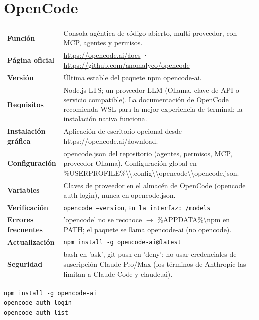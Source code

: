\section{OpenCode}
{\small\begin{tabularx}{\linewidth}{@{}>{\bfseries}p{2.9cm}X@{}}\toprule
Función & Consola agéntica de código abierto, multi-proveedor, con MCP, agentes y permisos.\\
Página oficial & \url{https://opencode.ai/docs} · \url{https://github.com/anomalyco/opencode}\\
Versión & Última estable del paquete npm opencode-ai.\\
Requisitos & Node.js LTS; un proveedor LLM (Ollama, clave de API o servicio compatible). La documentación de OpenCode recomienda WSL para la mejor experiencia de terminal; la instalación nativa funciona.\\
Instalación gráfica & Aplicación de escritorio opcional desde https://opencode.ai/download.\\
Configuración & opencode.json del repositorio (agentes, permisos, MCP, proveedor Ollama). Configuración global en \%USERPROFILE\%\textbackslash{}\textbackslash{}.config\textbackslash{}\textbackslash{}opencode\textbackslash{}\textbackslash{}opencode.json.\\
Variables & Claves de proveedor en el almacén de OpenCode (opencode auth login), nunca en opencode.json.\\
Verificación & \texttt{opencode --version}, \texttt{En la interfaz: /models}\\
Errores frecuentes & 'opencode' no se reconoce $\rightarrow$ \%APPDATA\%\textbackslash{}npm en PATH; el paquete se llama opencode-ai (no opencode).\\
Actualización & \texttt{npm install -g opencode-ai@latest}\\
Seguridad & bash en 'ask', git push en 'deny'; no usar credenciales de suscripción Claude Pro/Max (los términos de Anthropic las limitan a Claude Code y claude.ai).\\
\bottomrule\end{tabularx}}
\begin{lstlisting}[style=ps]
npm install -g opencode-ai
opencode auth login
opencode auth list
\end{lstlisting}

